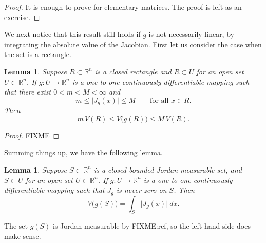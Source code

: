 \documentclass[12pt]{book}
\newcommand{\sabs}[1]{\lvert {#1} \rvert}
\newcommand{\R}{{\mathbb{R}}}
\theoremstyle{plain}
\newtheorem{lemma}[thm]{Lemma}
\theoremstyle{remark}
\theoremstyle{definition}
\theoremstyle{exercise}
\theoremstyle{example}
\begin{document}
\begin{proof}
It is enough to prove for elementary matrices.  The proof is left as an
exercise.
\end{proof}

We next notice that this result still holds if $g$ is not necessarily
linear, by integrating the absolute value of the Jacobian.
First let us consider the case when the set is a rectangle.

\begin{lemma}
Suppose $R \subset \R^n$ is a closed rectangle
and $R \subset U$ for an open set $U \subset \R^n$.  If
$g \colon U \to \R^n$ is a one-to-one
continuously differentiable mapping such that
there exist $0 < m < M < \infty$ and
\begin{equation*}
m \leq \sabs{J_g(x)} \leq M
\qquad \text{for all $x \in R$.}
\end{equation*}
Then
\begin{equation*}
m \, V(R) \leq V\bigl(g(R)\bigr) \leq M \, V(R) .
\end{equation*}
\end{lemma}

\begin{proof}
FIXME
\end{proof}

Summing things up, we have
the following lemma.

\begin{lemma}
Suppose $S \subset \R^n$ is a closed bounded Jordan measurable set,
and $S \subset U$ for an open set $U \subset \R^n$.  If
$g \colon U \to \R^n$ is a one-to-one
continuously differentiable mapping such that
$J_g$ is never zero on $S$.
Then
\begin{equation*}
V\bigl(g(S)\bigr)
=
\int_S \sabs{J_g(x)} ~ dx .
\end{equation*}
\end{lemma}

The set $g(S)$ is Jordan measurable by FIXME:ref, so the left hand side does
make sense.
\end{document}
